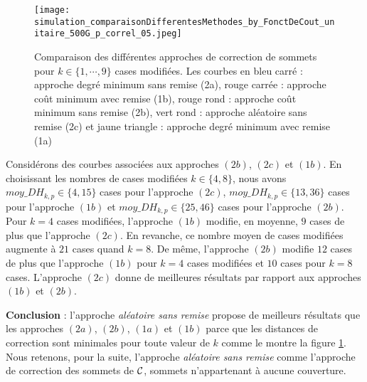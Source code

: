 \begin{figure}[htb!] 
\centering
\texttt{[image: simulation\_comparaisonDifferentesMethodes\_by\_FonctDeCout\_unitaire\_500G\_p\_correl\_05.jpeg]}
\caption{ Comparaison des diff\'erentes approches de correction de sommets pour $k \in \{1,\cdots,9\}$ cases modifi\'ees. 
Les courbes en bleu carr\'e : approche degr\'e minimum sans remise (2a), 
			rouge carr\'ee : approche co\^ut minimum avec remise (1b), 
			rouge rond : approche co\^ut minimum sans remise (2b), 
			vert rond : approche al\'eatoire sans remise (2c) et 
			jaune triangle : approche degr\'e minimum avec remise (1a) 
}
\label{compareDifferentesMethodesCorrectionSommets_fct_cout_normal_p05} 
\end{figure}
\FloatBarrier


Consid\'erons des courbes associ\'ees aux approches $(2b)$, $(2c)$ et $(1b)$. 
En choisissant les nombres de cases modifi\'ees $k \in \{4, 8\}$, nous avons $moy\_DH_{k,p} \in \{4,15\}$ cases pour l'approche $(2c)$, $moy\_DH_{k,p} \in \{13, 36\}$ cases  pour l'approche $(1b)$ et $moy\_DH_{k,p} \in \{25, 46\}$ cases  pour l'approche $(2b)$.
Pour $k=4$ cases modifi\'ees, l'approche $(1b)$  modifie, en moyenne, $9$ cases de plus que l'approche $(2c)$. En revanche, ce nombre moyen de cases modifi\'ees augmente \`a $21$ cases quand $k=8$. 
De m\^eme, l'approche $(2b)$ modifie $12$ cases de plus que l'approche $(1b)$ pour $k=4$ cases modifi\'ees et $10$ cases pour $k=8$ cases.
L'approche  $(2c)$ donne de meilleures r\'esultats par rapport aux approches $(1b)$ et $(2b)$.
\newline


{\bf Conclusion} : l'approche {\em al\'eatoire sans remise} propose de meilleurs r\'esultats que les approches $(2a)$, $(2b)$, $(1a)$ et $(1b)$ parce que les distances de correction sont minimales pour toute valeur de $k$ comme le montre la figure \ref{compareDifferentesMethodesCorrectionSommets_fct_cout_normal_p05}.
Nous retenons, pour la suite,  l'approche {\em al\'eatoire sans remise}  comme l'approche de correction des sommets de $\cal C$, sommets n'appartenant \`a aucune couverture.



